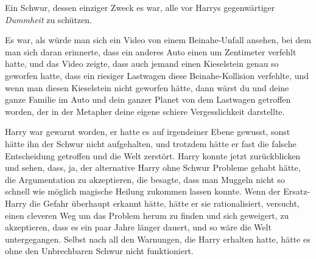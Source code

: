 Ein Schwur, dessen einziger Zweck es war, alle vor Harrys gegenwärtiger \emph{Dummheit} zu schützen.

Es war, als würde man sich ein Video von einem Beinahe-Unfall ansehen, bei dem man sich daran erinnerte, dass ein anderes Auto einen um Zentimeter verfehlt hatte, und das Video zeigte, dass auch jemand einen Kieselstein genau so geworfen hatte, dass ein riesiger Lastwagen diese Beinahe-Kollision verfehlte, und wenn man diesen Kieselstein nicht geworfen hätte, dann wärst du und deine ganze Familie im Auto und dein ganzer Planet von dem Lastwagen getroffen worden, der in der Metapher deine eigene schiere Vergesslichkeit darstellte.

Harry war gewarnt worden, er hatte es auf irgendeiner Ebene gewusst, sonst hätte ihn der Schwur nicht aufgehalten, und trotzdem hätte er fast die falsche Entscheidung getroffen und die Welt zerstört. Harry konnte jetzt zurückblicken und sehen, dass, ja, der alternative Harry ohne Schwur Probleme gehabt hätte, die Argumentation zu akzeptieren, die besagte, dass man Muggeln nicht so schnell wie möglich magische Heilung zukommen lassen konnte.
Wenn der Ersatz-Harry die Gefahr überhaupt erkannt hätte, hätte er sie rationalisiert, versucht, einen cleveren Weg um das Problem herum zu finden und sich geweigert, zu akzeptieren, dass es ein paar Jahre länger dauert, und so wäre die Welt untergegangen. Selbst nach all den Warnungen, die Harry erhalten hatte, hätte es ohne den Unbrechbaren Schwur nicht funktioniert.


